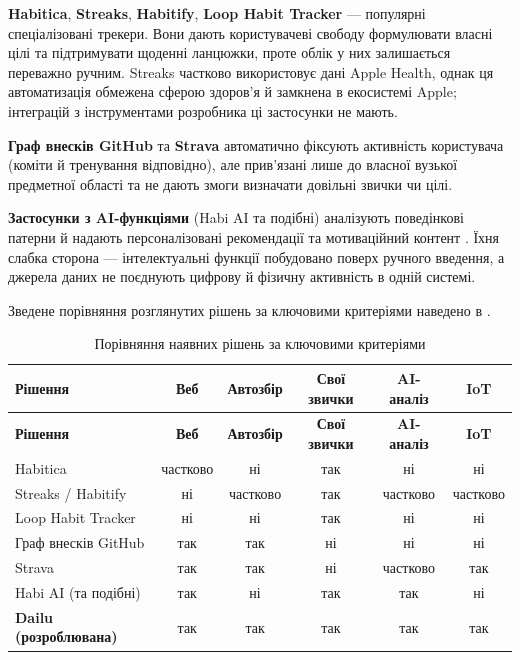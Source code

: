 \textbf{Habitica}, \textbf{Streaks}, \textbf{Habitify}, \textbf{Loop Habit Tracker} — популярні
спеціалізовані трекери.
Вони дають користувачеві свободу формулювати власні цілі та підтримувати щоденні ланцюжки,
проте облік у них залишається переважно ручним.
Streaks частково використовує дані Apple Health, однак ця автоматизація обмежена сферою
здоров'я й замкнена в екосистемі Apple; інтеграцій з інструментами розробника ці застосунки не
мають.

\textbf{Граф внесків GitHub} та \textbf{Strava} автоматично фіксують активність користувача
(коміти й тренування відповідно), але прив'язані лише до власної вузької предметної області та
не дають змоги визначати довільні звички чи цілі.

\textbf{Застосунки з AI-функціями} (Habi AI та подібні) аналізують поведінкові патерни й
надають персоналізовані рекомендації та мотиваційний контент .
Їхня слабка сторона — інтелектуальні функції побудовано поверх ручного введення, а джерела
даних не поєднують цифрову й фізичну активність в одній системі.

Зведене порівняння розглянутих рішень за ключовими критеріями наведено в .

\begin{center}
    \begin{xltabular}{\textwidth}{| >{\raggedright\arraybackslash}X | c | c | c | c | c |}
        \caption{Порівняння наявних рішень за ключовими критеріями} \label{tab:analogs} \\
        \hline
        \textbf{Рішення} & \textbf{Веб} & \textbf{Автозбір} & \textbf{Свої звички} & \textbf{AI-аналіз} & \textbf{IoT} \\ \hline
        \endfirsthead

        \hline
        \textbf{Рішення} & \textbf{Веб} & \textbf{Автозбір} & \textbf{Свої звички} & \textbf{AI-аналіз} & \textbf{IoT} \\ \hline
        \endhead

        Habitica & частково & ні & так & ні & ні \\ \hline
        Streaks / Habitify & ні & частково & так & частково & частково \\ \hline
        Loop Habit Tracker & ні & ні & так & ні & ні \\ \hline
        Граф внесків GitHub & так & так & ні & ні & ні \\ \hline
        Strava & так & так & ні & частково & так \\ \hline
        Habi AI (та подібні) & так & ні & так & так & ні \\ \hline
        \textbf{Dailu (розроблювана)} & так & так & так & так & так \\ \hline
    \end{xltabular}
\end{center}

